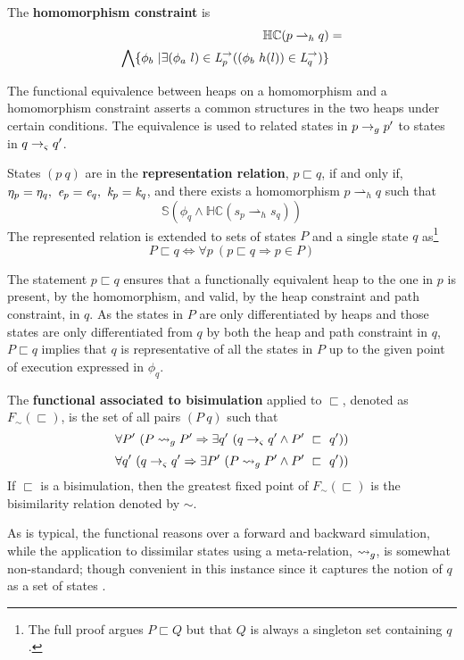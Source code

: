 \begin{definition}
\label{def:hc}
The \textbf{homomorphism constraint} is
\begin{align*}
\mathbb{HC}(p \rightharpoonup_{h} q) &= \\
 \bigwedge \{ \phi_b\ | \exists (\phi_a\ l) \in \emph{L}_p^\rightarrow ( (\phi_b\ h(l)) \in \emph{L}_q^\rightarrow)\} 
\end{align*}
\end{definition}
The functional equivalence between heaps on a homomorphism and
a homomorphism constraint asserts a common structures in the two heaps under certain
conditions. The equivalence is used to related states in $p \rightarrow_{g}
p^\prime$ to states in $q \rightarrow_{\varsigma} q^\prime$.
\begin{definition}
\label{representation}
States $(p\ q)$ are in the \textbf{representation relation}, $p \sqsubset q$, if and only if, $\eta_p = \eta_q ,\ \cfgnt{e}_p =
\cfgnt{e}_q ,\ \cfgnt{k}_p = \cfgnt{k}_q$, and there exists a
homomorphism $p \rightharpoonup_{h}
q$ such that
\begin{equation}
\label{eqn:valid}
 \mathbb{S}( \phi_q \wedge \mathbb{HC}(s_p \rightharpoonup_{h} s_q) ) 
\end{equation}
The represented relation is extended to sets of states $P$ and a single state $q$ as\footnote{The full proof argues $P \sqsubset Q$ but that $Q$ is
  always a singleton set containing $q$.}
$$
P \sqsubset q \Longleftrightarrow \forall p\ (p \sqsubset q \Rightarrow p \in P)
$$
\end{definition}
The statement $p \sqsubset q$ ensures that a functionally equivalent
heap to the one in $p$ is present, by the homomorphism, and valid, by
the heap constraint and path constraint, in $q$. As the states in $P$
are only differentiated by heaps and those states are only
differentiated from $q$ by both the heap and path constraint in $q$,
$P \sqsubset q$ implies that $q$ is representative of all the states
in $P$ up to the given point of execution expressed in $\phi_q$.
\begin{definition}
\label{bisimulation}
The \textbf{functional associated to bisimulation} applied to $\sqsubset$, denoted as $F_\sim(\sqsubset)$, is the set of all pairs
$(P\ q)$ such that
\begin{equation}
\label{eqn:BisimulationForwards}
\forall P^\prime\ ( P \leadsto_{g} P^\prime \Rightarrow \exists q^\prime\ ( q \rightarrow_{\varsigma} q^\prime \wedge P^\prime\ \sqsubset\ q^\prime))
\end{equation}
\begin{equation}
\label{eqn:BisimulationBackwards}
\forall q^\prime\ ( q \rightarrow_{\varsigma} q^\prime\Rightarrow \exists P^\prime\ ( P \leadsto_{g} P^\prime \wedge P^\prime\ \sqsubset\ q^\prime))
\end{equation}
If $\sqsubset$ is a bisimulation, then the greatest fixed point of $F_\sim(\sqsubset)$ is the bisimilarity relation denoted by $\sim$.
\end{definition}
As is typical, the functional reasons over a forward and backward
simulation, while the application to dissimilar states using a
meta-relation, $\leadsto_{g}$, is somewhat non-standard; though convenient
in this instance since it captures the notion of $q$ as a set of
states \cite{GSE:barbedbisimulation}. 

